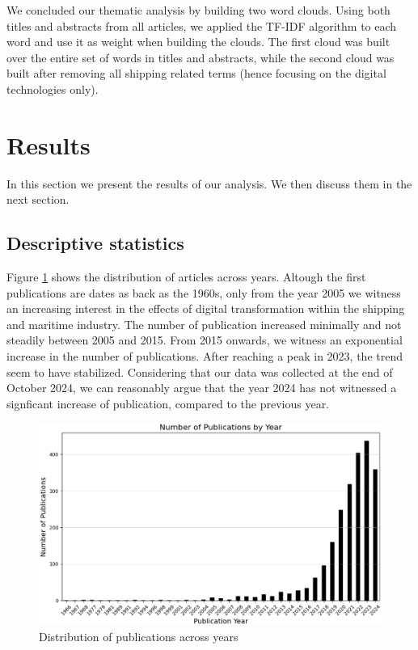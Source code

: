\documentclass[a4paper, review, endfloat, authoryear]{elsarticle}
\begin{document}
	We concluded our thematic analysis by building two word clouds. Using both titles and abstracts from all articles, we applied the TF-IDF algorithm to each word and use it as weight when building the clouds. The first cloud was built over the entire set of words in titles and abstracts, while the second cloud was built after removing all shipping related terms (hence focusing on the digital technologies only).
	
	\section{Results}
	In this section we present the results of our analysis. We then discuss them in the next section.
	
	\subsection{Descriptive statistics}
	Figure \ref{fig:fig1} shows the distribution of articles across years. Altough the first publications are dates as back as the 1960s, only from the year 2005 we witness an increasing interest in the effects of digital transformation within the shipping and maritime industry. The number of publication increased minimally and not steadily between 2005 and 2015. From 2015 onwards, we witness an exponential increase in the number of publications. After reaching a peak in 2023, the trend seem to have stabilized. Considering that our data was collected at the end of October 2024, we can reasonably argue that the year 2024 has not witnessed a signficant increase of publication, compared to the previous year.
	
	\begin{figure}[htbp]
		\centering
		\includegraphics[scale=0.8]{pics/no_publications_year.eps}
		\caption{Distribution of publications across years}\label{fig:fig1}
	\end{figure}
	
\end{document}
